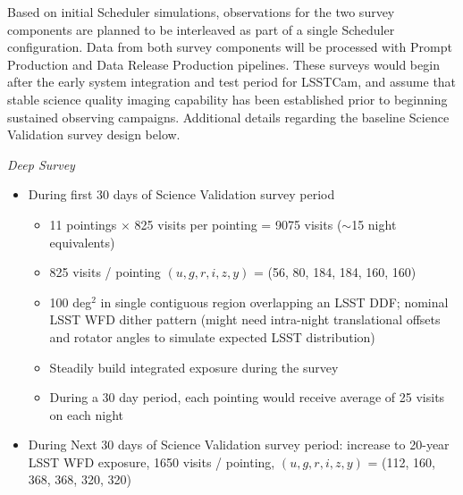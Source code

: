 Based on initial Scheduler simulations, observations for the two survey components are planned to be interleaved as part of a single Scheduler configuration.
Data from both survey components will be processed with Prompt Production and Data Release Production pipelines.
These surveys would begin after the early system integration and test period for LSSTCam, and assume that stable science quality imaging capability has been established prior to beginning sustained observing campaigns.
Additional details regarding the baseline Science Validation survey design below.

\textit{Deep Survey}

\begin{itemize}

        \item During first 30 days of Science Validation survey period

        \begin{itemize}

                \item 11 pointings $\times$ 825 visits per pointing = 9075 visits ($\sim$15 night equivalents)
                \item 825 visits / pointing $(u, g, r, i, z, y)$ = (56, 80, 184, 184, 160, 160)
                \item 100 deg$^2$ in single contiguous region overlapping an LSST DDF; nominal LSST WFD dither pattern (might need intra-night translational offsets and rotator angles to simulate expected LSST distribution)
                \item Steadily build integrated exposure during the survey
                \item During a 30 day period, each pointing would receive average of 25 visits on each night

        \end{itemize}

        \item During Next 30 days of Science Validation survey period: increase to 20-year LSST WFD exposure, 1650 visits / pointing, $(u, g, r, i, z, y)$ = (112, 160, 368, 368, 320, 320)

\end{itemize}

